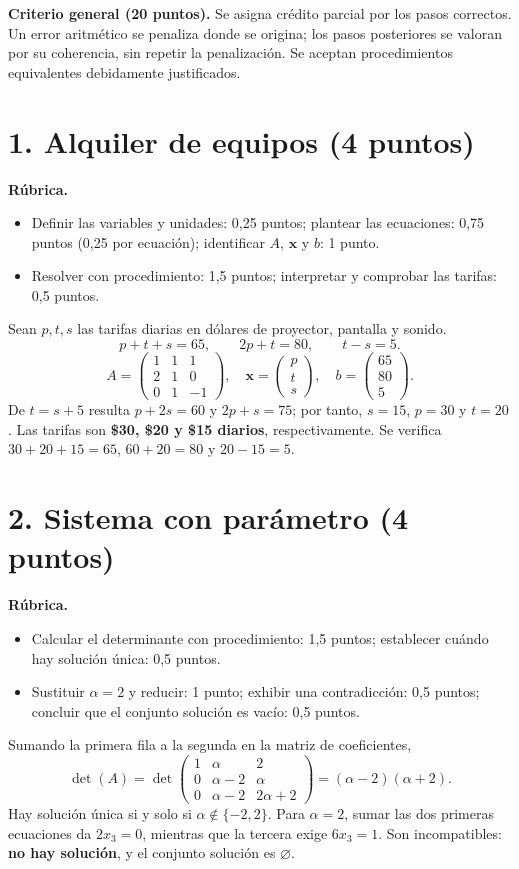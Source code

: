 \documentclass[10pt,a4]{examenEPN0}
\begin{document}
\encabezado
\noindent\textbf{Criterio general (20 puntos).} Se asigna crédito parcial por
los pasos correctos. Un error aritmético se penaliza donde se origina;
los pasos posteriores se valoran por su coherencia, sin repetir la penalización.
Se aceptan procedimientos equivalentes debidamente justificados.

\section*{1. Alquiler de equipos (4 puntos)}
\noindent\textbf{Rúbrica.}
\begin{itemize}[itemsep=2pt]
    \item Definir las variables y unidades: 0,25 puntos; plantear las ecuaciones: 0,75 puntos (0,25 por ecuación); identificar $A$, $\mathbf{x}$ y $b$: 1 punto.
    \item Resolver con procedimiento: 1,5 puntos; interpretar y comprobar las tarifas: 0,5 puntos.
\end{itemize}
Sean $p,t,s$ las tarifas diarias en dólares de proyector, pantalla y sonido.
\[
    p+t+s=65,\qquad 2p+t=80,\qquad t-s=5.
\]
\[
    A=\begin{pmatrix}1&1&1\\2&1&0\\0&1&-1\end{pmatrix},\quad
    \mathbf{x}=\begin{pmatrix}p\\t\\s\end{pmatrix},\quad
    b=\begin{pmatrix}65\\80\\5\end{pmatrix}.
\]
De $t=s+5$ resulta $p+2s=60$ y $2p+s=75$; por tanto,
$s=15$, $p=30$ y $t=20$.
Las tarifas son \textbf{\$30, \$20 y \$15 diarios}, respectivamente.
Se verifica $30+20+15=65$, $60+20=80$ y $20-15=5$.

\section*{2. Sistema con parámetro (4 puntos)}
\noindent\textbf{Rúbrica.}
\begin{itemize}[itemsep=2pt]
    \item Calcular el determinante con procedimiento: 1,5 puntos; establecer cuándo hay solución única: 0,5 puntos.
    \item Sustituir $\alpha=2$ y reducir: 1 punto; exhibir una contradicción: 0,5 puntos; concluir que el conjunto solución es vacío: 0,5 puntos.
\end{itemize}
Sumando la primera fila a la segunda en la matriz de coeficientes,
\[
    \det(A)=\det\begin{pmatrix}1&\alpha&2\\0&\alpha-2&\alpha\\0&\alpha-2&2\alpha+2\end{pmatrix}
    =(\alpha-2)(\alpha+2).
\]
Hay solución única si y solo si $\alpha\notin\{-2,2\}$.
Para $\alpha=2$, sumar las dos primeras ecuaciones da $2x_3=0$,
mientras que la tercera exige $6x_3=1$. Son incompatibles:
\textbf{no hay solución}, y el conjunto solución es $\varnothing$.
\end{document}
